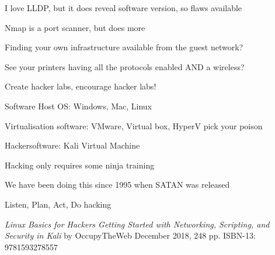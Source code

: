 \documentclass[Screen16to9,17pt]{foils}
\begin{document}
\vskip 5mm
\centerline{I love LLDP, but it does reveal software version, so flaws available}





\begin{list2}
\item Nmap is a port scanner, but does more
\item Finding your own infrastructure available from the guest network?
\item See your printers having all the protocols enabled AND a wireless?
\end{list2}



\begin{list2}
\item Create hacker labs, encourage hacker labs!
\item Software Host OS: Windows, Mac, Linux
\item Virtualisation software: VMware, Virtual box, HyperV pick your poison
\item Hackersoftware: Kali Virtual Machine 
\end{list2}



\begin{list2}
\item Hacking only requires some ninja training
\item We have been doing this since 1995 when SATAN was released
\item Listen, Plan, Act, Do hacking
\end{list2}



\emph{Linux Basics for Hackers
Getting Started with Networking, Scripting, and Security in Kali}
by OccupyTheWeb
December 2018, 248 pp.
ISBN-13:
9781593278557

\end{document}
